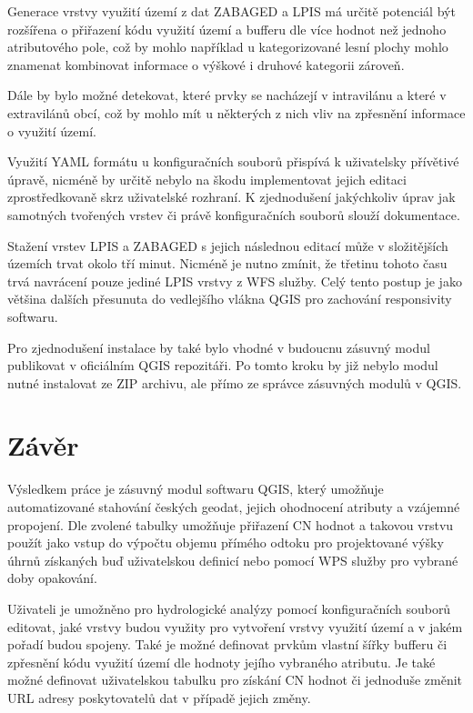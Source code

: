 \documentclass[a4paper,oneside,12pt]{book}
\begin{document}
\hspace{10mm} Generace vrstvy využití území z dat ZABAGED a LPIS má určitě potenciál být rozšířena o přiřazení kódu využití území a bufferu dle více hodnot než jednoho atributového pole, což by mohlo například u kategorizované lesní plochy mohlo znamenat kombinovat informace o výškové i druhové kategorii zároveň. 

\hspace{10mm} Dále by bylo možné detekovat, které prvky se nacházejí v intravilánu a které v extravilánů obcí, což by mohlo mít u některých z nich vliv na zpřesnění informace o využití území.

\hspace{10mm} Využití YAML formátu u konfiguračních souborů přispívá k uživatelsky přívětivé úpravě, nicméně by určitě nebylo na škodu implementovat jejich editaci zprostředkovaně skrz uživatelské rozhraní. K zjednodušení jakýchkoliv úprav jak samotných tvořených vrstev či právě konfiguračních souborů slouží dokumentace.

\hspace{10mm} Stažení vrstev LPIS a ZABAGED s jejich následnou editací může v složitějších územích trvat okolo tří minut. Nicméně je nutno zmínit, že třetinu tohoto času trvá navrácení pouze jediné LPIS vrstvy z WFS služby. Celý tento postup je jako většina dalších přesunuta do vedlejšího vlákna QGIS pro zachování responsivity softwaru. 

\hspace{10mm} Pro zjednodušení instalace by také bylo vhodné v budoucnu zásuvný modul publikovat v oficiálním QGIS repozitáři. Po tomto kroku by již nebylo modul nutné instalovat ze ZIP archivu, ale přímo ze správce zásuvných modulů v QGIS.

\chapter*{Závěr} \label{results}
\hspace{10mm} Výsledkem práce je zásuvný modul softwaru QGIS, který umožňuje automatizované stahování českých geodat, jejich ohodnocení atributy a vzájemné propojení. Dle zvolené tabulky umožňuje přiřazení CN hodnot a takovou vrstvu použít jako vstup do výpočtu objemu přímého odtoku pro projektované výšky úhrnů získaných buď uživatelskou definicí nebo pomocí WPS služby pro vybrané doby opakování.

\hspace{10mm} Uživateli je umožněno pro hydrologické analýzy pomocí konfiguračních souborů editovat, jaké vrstvy budou využity pro vytvoření vrstvy využití území a v jakém pořadí budou spojeny. Také je možné definovat prvkům vlastní šířky bufferu či zpřesnění kódu využití území dle hodnoty jejího vybraného atributu. Je také možné definovat uživatelskou tabulku pro získání CN hodnot či jednoduše změnit URL adresy poskytovatelů dat v případě jejich změny.
\end{document}
